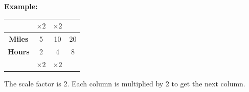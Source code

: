 \documentclass[12pt, letterpaper, fleqn]{article}
\begin{document}
\begin{tcolorbox}[colback=white, colframe=black!25, boxrule=0.6pt, arc=4mm, left=6mm, right=6mm, top=5mm, bottom=5mm]

\textbf{Example:}

\begin{center}
\begin{tabular}{|c|c|c|c|}
\hline
& $\times 2$ & $\times 2$ & \\
\hline
\textbf{Miles} & 5 & 10 & 20 \\
\hline
\textbf{Hours} & 2 & 4 & 8 \\
\hline
& $\times 2$ & $\times 2$ & \\
\hline
\end{tabular}
\end{center}

\noindent
The scale factor is 2. Each column is multiplied by 2 to get the next column.

\end{tcolorbox}
\end{document}

